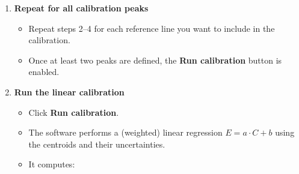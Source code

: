 \begin{enumerate}
  \begin{itemize}
  \tightlist
  \item
    Click \textbf{Fit Gaussian}.\\
  \item
    The program extracts the data around the selected center, performs a
    Gaussian fit, and returns:

    \begin{itemize}
    \tightlist
    \item
      Centroid \(C\) (fitted channel),\\
    \item
      Sigma (peak width),\\
    \item
      Amplitude,\\
    \item
      Uncertainty on the centroid.\\
    \end{itemize}
  \item
    The peak is added to the Treeview with its centroid and reference
    energy, and details are appended to the text area.
  \end{itemize}
\item
  \textbf{Repeat for all calibration peaks}

  \begin{itemize}
  \tightlist
  \item
    Repeat steps 2--4 for each reference line you want to include in the
    calibration.\\
  \item
    Once at least two peaks are defined, the \textbf{Run calibration}
    button is enabled.
  \end{itemize}
\item
  \textbf{Run the linear calibration}

  \begin{itemize}
  \tightlist
  \item
    Click \textbf{Run calibration}.\\
  \item
    The software performs a (weighted) linear regression
    \(E = a \cdot C + b\) using the centroids and their uncertainties.\\
  \item
    It computes:


\end{itemize}
\end{enumerate}
